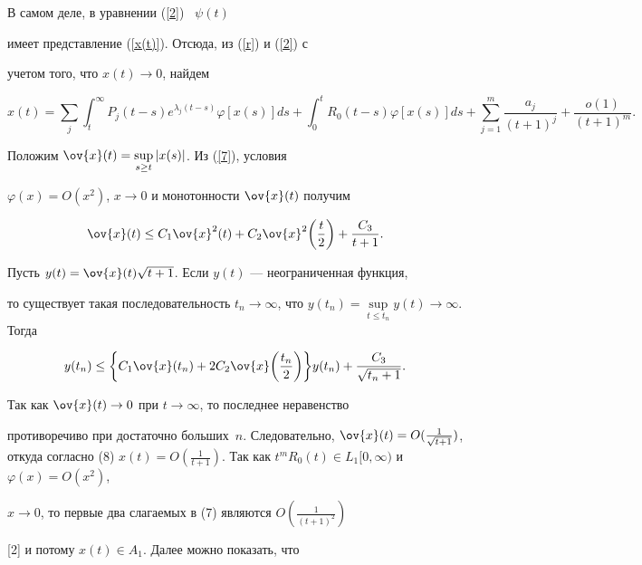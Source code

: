 В самом деле, в уравнении (\ref{2}) \ $\psi(t)$


имеет представление (\ref{x(t)}). Отсюда, из (\ref{r}) и (\ref{2}) с


учетом того, что $x(t) \to 0$, найдем


\begin{equation}\label{7}


x(t)= \sum_j \int_t^\infty P_j (t-s) e^{\lambda_j (t-s)}\varphi[x(s)


]ds+\int_0^t R_0(t-s)\varphi[x(s)]ds+


\sum_{j=1}^m \frac{a_j} {(t+1)^j} + \frac{o(1)}{(t+1)^m}.


\end{equation}


Положим $\ov{x}(t)=\sup\limits_{s \ge t} |x(s)|$. Из (\ref{7}), условия


$\varphi(x)=O(x^2)$, $x \to 0$ и монотонности $\ov{x}(t)$ получим


\begin{equation}


\ov{x}(t) \le C_1 \ov{x}^2 (t) +C_2 \ov{x}^2 \bigg(\frac{t}{2} \bigg)+


\frac{C_3} {t+1}.


\end{equation}


Пусть $y(t) = \ov{x}(t)\sqrt{t+1}$. Если $y(t)$ --- неограниченная функция,


то существует такая последовательность $t_n \to \infty$, что $y(t_n)=\sup


\limits_{t \le t_n} y(t) \to \infty$. Тогда


$$


y(t_n) \le \bigg \{ C_1 \ov{x}(t_n) +2 C_2 \ov{x} \bigg (\frac{t_n}{2}


\bigg) \bigg\} y(t_n)+ \frac{C_3} {\sqrt{t_n+1}}.


$$


Так как $\ov{x}(t) \to 0$ при $t \to \infty$, то последнее неравенство


противоречиво при достаточно больших~$n$. Следовательно, $\ov{x}(t)=O(


\frac{1}{\sqrt{t+1}})$, откуда согласно (8) $x(t) = O(\frac{1}


{t+1})$. Так как $t^m R_0(t) \in L_1[0,\infty)$ и $\varphi(x)=O(x^2)$,


$x \to 0$, то первые два слагаемых в (7) являются $O(\frac{1}{(t+1)^2})$


[2] и потому $x(t) \in A_1$. Далее можно показать, что


